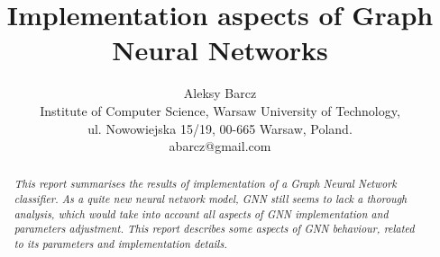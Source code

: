 \documentclass[a4paper, 11pt, twocolumn]{spie}  %
\title{Implementation aspects of Graph Neural Networks}
\author{
Aleksy Barcz\\
{\normalsize Institute of Computer Science, Warsaw University of Technology,\\
ul. Nowowiejska 15/19, 00-665 Warsaw, Poland.\\
abarcz@gmail.com}
}
\begin{document}
 
\maketitle 

\begin{abstract}
\emph{This report summarises the results of implementation of a Graph Neural Network~ classifier. As a quite new neural network model, GNN still seems to lack a thorough analysis, which would take into account all aspects of GNN implementation and parameters adjustment. This report describes some aspects of GNN behaviour, related to its parameters and implementation details.}
\end{abstract}



\end{document}
